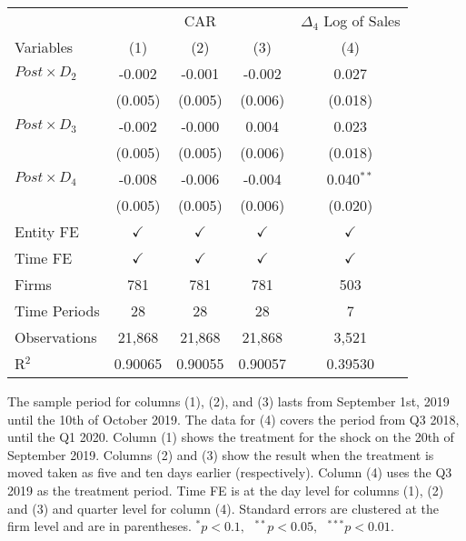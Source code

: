 \documentclass[12pt]{article}
\begin{document}
\begin{table}[t]
    
    \label{tab:main_results}
    
    \centering
    \begin{tabular}{l c c c c }
        \toprule
        \toprule
        & \multicolumn{3}{c}{CAR}     & \multicolumn{1}{c}{$\Delta_4$ Log of Sales} \\
        Variables                   & {(1)}           & {(2)} & {(3)}   & {(4)}\\
        \midrule
        $Post \times D_2$           & -0.002       &  -0.001   & -0.002  & 0.027\\
                                    & (0.005)      &  (0.005)  & (0.006)  & (0.018)\\
        $Post \times D_3$           & -0.002       &  -0.000   & 0.004  & 0.023\\
                                    & (0.005)      &  (0.005)  & (0.006)  & (0.018)\\
        $Post \times D_4$           & -0.008       &  -0.006   & -0.004  & 0.040$^{**}$\\
                                    & (0.005)      &  (0.005)  & (0.006)  & (0.020)\\
        Entity FE                   & {$\checkmark$}  & {$\checkmark$}  & {$\checkmark$}  & {$\checkmark$}\\
        Time FE                     & {$\checkmark$}  & {$\checkmark$}  & {$\checkmark$}  & {$\checkmark$}\\
        Firms                       & {781}           & {781}  & {781}  & {503}\\
        Time Periods                & {28}            & {28}  & {28}  & {7}\\
        Observations                & {21,868}        & {21,868}  & {21,868}  & {3,521}\\
        R$^2$                       & {0.90065}       & {0.90055}  & {0.90057}  & {0.39530}\\  
        \bottomrule
    \end{tabular}
    
    \vspace{0.2cm}

    \begin{tablenotes}
        \footnotesize
        \item The sample period for columns (1), (2), and (3) lasts from September 1st, 2019 until the 10th of October 2019. The data for (4) covers the period from Q3 2018, until the Q1 2020. Column (1) shows the treatment for the shock on the 20th of September 2019. Columns (2) and (3) show the result when the treatment is moved taken as five and ten days earlier (respectively). Column (4) uses the Q3 2019 as the treatment period. Time FE is at the day level for columns (1), (2) and (3) and quarter level for column (4). Standard errors are clustered at the firm level and are in parentheses. $^{*}p<0.1, \text{ } ^{**}p<0.05,\text{ } ^{***}p<0.01$.
    \end{tablenotes}
\end{table}
\end{document}
